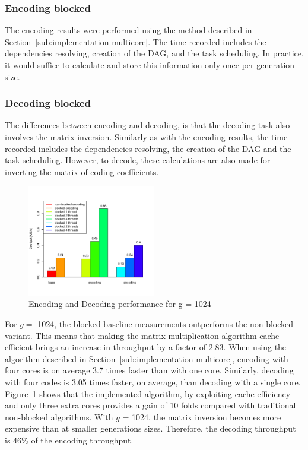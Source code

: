 \subsubsection{Encoding blocked}
The encoding results were performed using the
method described in Section~\ref{sub:implementation-multicore}. The time
recorded includes the dependencies resolving, creation of the \ac{DAG},
and the task scheduling. In practice, it would suffice to calculate and
store this information only once per generation size.

\subsubsection{Decoding blocked}
The differences between encoding and decoding, is that the decoding task
also involves the matrix inversion. Similarly as with the encoding results,
the time recorded includes the dependencies resolving, the creation of the
\ac{DAG} and the task scheduling. However, to decode, these calculations are also made for inverting the matrix of coding coefficients.

\begin{figure}[ht!]
\centering
\includegraphics[width=0.5\textwidth]{images/2015-04-18_encoding_decoding_1024.pdf}
\caption{Encoding and Decoding performance for g = 1024 \cite{wunderlich2015network}}
\label{enc_dec1024}
\end{figure}

For $g=$ 1024, the blocked baseline measurements outperforms the non blocked
variant. This means that making the matrix multiplication algorithm cache
efficient brings an increase in throughput by a factor of 2.83. When using the
algorithm described in Section~\ref{sub:implementation-multicore},
encoding with four cores is on average 3.7 times faster than with one core.
Similarly, decoding with four codes is 3.05 times faster, on average, than
decoding with a single core. Figure~\ref{enc_dec1024} shows that the
implemented algorithm, by exploiting cache efficiency and only three extra
cores provides a gain of 10 folds compared with traditional non-blocked
algorithms. With $g$ = 1024, the matrix inversion becomes more expensive
than at smaller generations sizes. Therefore, the decoding throughput
is 46\% of the encoding throughput.

